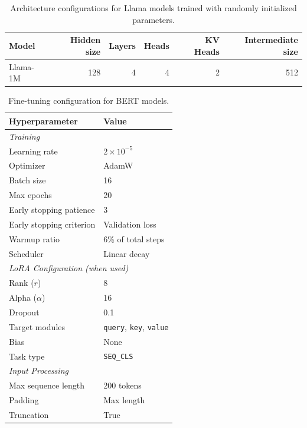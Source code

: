 \documentclass{article}
\theoremstyle{plain}
\theoremstyle{definition}
\theoremstyle{remark}
\begin{document}
\begin{table}[h]
\centering
\caption{Architecture configurations for Llama models trained with randomly initialized parameters.}
\label{tab:tiny_llm_config}
\begin{tabular}{lrrrrr}
\toprule
Model & Hidden size & Layers & Heads & KV Heads & Intermediate size \\
\midrule
Llama-1M & 128 & 4 & 4 & 2 & 512 \\
\bottomrule
\end{tabular}
\end{table}



\begin{table}[h]
\centering
\caption{Fine-tuning configuration for BERT models.}
\label{tab:bert_config}
\begin{tabular}{ll}
\toprule
Hyperparameter & Value \\
\midrule
\multicolumn{2}{l}{\textit{Training}} \\
Learning rate & $2 \times 10^{-5}$ \\
Optimizer & AdamW \\
Batch size & 16 \\
Max epochs & 20 \\
Early stopping patience & 3 \\
Early stopping criterion & Validation loss \\
Warmup ratio & 6\% of total steps \\
Scheduler & Linear decay \\
\midrule
\multicolumn{2}{l}{\textit{LoRA Configuration (when used)}} \\
Rank ($r$) & 8 \\
Alpha ($\alpha$) & 16 \\
Dropout & 0.1 \\
Target modules & \texttt{query}, \texttt{key}, \texttt{value} \\
Bias & None \\
Task type & \texttt{SEQ\_CLS} \\
\midrule
\multicolumn{2}{l}{\textit{Input Processing}} \\
Max sequence length & 200 tokens \\
Padding & Max length \\
Truncation & True \\
\bottomrule
\end{tabular}
\end{table}
\end{document}
